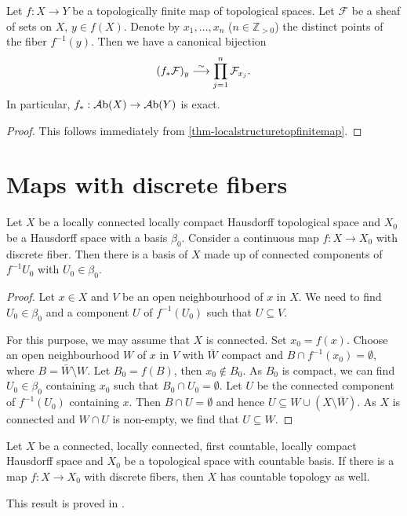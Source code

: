 \begin{corollary}\label{cor-pushforwardsheaffinite}
    Let $f:X\rightarrow Y$ be a topologically finite map of topological spaces. Let $\mathcal{F}$ be a sheaf of sets on $X$, $y\in f(X)$. Denote by $x_1,\ldots,x_n$ ($n\in \mathbb{Z}_{>0}$) the distinct points of the fiber $f^{-1}(y)$. Then we have a canonical bijection
    \[
        (f_*\mathcal{F})_y\stackrel{\sim}{\longrightarrow} \prod_{j=1}^n \mathcal{F}_{x_j}.
    \]
    In particular, $f_*:\mathcal{A}\mathrm{b}(X)\rightarrow \mathcal{A}\mathrm{b}(Y)$ is exact.
\end{corollary}
\begin{proof}
    This follows immediately from \cref{thm-localstructuretopfinitemap}.
\end{proof}

\section{Maps with discrete fibers}

\begin{lemma}\label{lma-connectedcompofiberdim0basis}
    Let $X$ be a locally connected locally compact Hausdorff topological space and $X_0$ be a Hausdorff space with a basis $\beta_0$. Consider a continuous map $f:X\rightarrow X_0$ with discrete fiber. Then there is a basis of $X$ made up of connected components of $f^{-1}U_0$ with $U_0\in \beta_0$.
\end{lemma}
\begin{proof}
    Let $x\in X$ and $V$ be an open neighbourhood of $x$ in $X$. We need to find $U_0\in \beta_0$ and a component $U$ of $f^{-1}(U_0)$ such that $U\subseteq V$.
    
    For this purpose, we may assume that $X$ is connected. Set $x_0=f(x)$.
    Choose an open neighbourhood $W$ of $x$ in $V$ with $\bar{W}$ compact and $B\cap f^{-1}(x_0)=\emptyset$, where $B=\bar{W}\setminus W$. Let $B_0=f(B)$, then $x_0\not\in B_0$. As $B_0$ is compact, we can find $U_0\in \beta_0$ containing $x_0$ such that $B_0\cap U_0=\emptyset$. Let $U$ be the connected component of $f^{-1}(U_0)$ containing $x$. Then $B\cap U=\emptyset$ and hence $U\subseteq W\cup (X\setminus \bar{W})$. As $X$ is connected and $W\cap U$ is non-empty, we find that $U\subseteq W$.
\end{proof}

\begin{proposition}\label{prop-fiberdiscountablebasisinh}
    Let $X$ be a connected, locally connected, first countable, locally compact Hausdorff space and $X_0$ be a topological space with countable basis. If there is a map $f:X\rightarrow X_0$ with discrete fibers, then $X$ has countable topology as well.
\end{proposition}
This result is proved in \cite{Jur59}.

